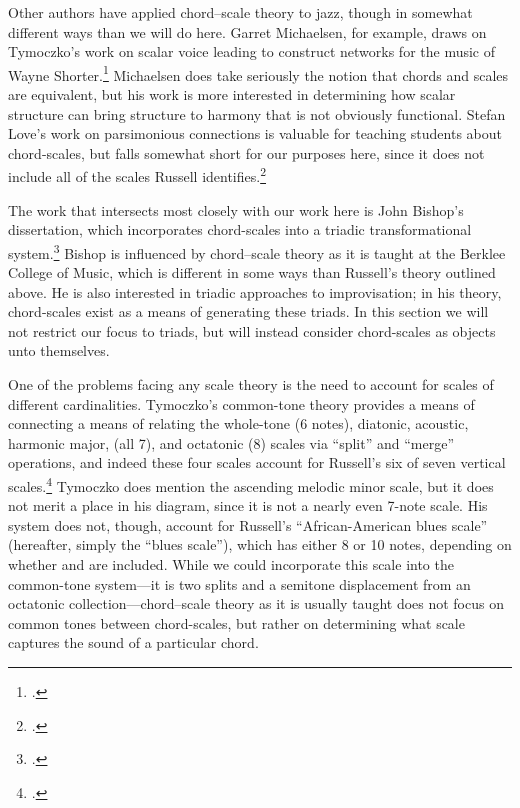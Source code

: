 Other authors have applied chord--scale theory to jazz, though in somewhat
different ways than we will do here. Garret Michaelsen, for example, draws on
Tymoczko's work on scalar voice leading to construct networks for the music of
Wayne Shorter.\footcite{michaelsen:2012} Michaelsen does take seriously the
notion that chords and scales are equivalent, but his work is more interested
in determining how scalar structure can bring structure to harmony that is not
obviously functional. Stefan Love's work on parsimonious connections is
valuable for teaching students about chord-scales, but falls somewhat short
for our purposes here, since it does not include all of the scales Russell
identifies.\footcite{love:2009}

The work that intersects most closely with our work here is John Bishop's
dissertation, which incorporates chord-scales into a triadic transformational
system.\footcite{bishop:2012} Bishop is influenced by chord--scale theory as
it is taught at the Berklee College of Music, which is different in some ways
than Russell's theory outlined above. He is also interested in
triadic approaches to improvisation; in his theory, chord-scales exist as a
means of generating these triads. In this section we will not
restrict our focus to triads, but will instead consider chord-scales as
objects unto themselves.

One of the problems facing any scale theory is the need to account for scales
of different cardinalities. Tymoczko's common-tone theory provides a means of
connecting a means of relating the whole-tone (6 notes), diatonic, acoustic,
harmonic major, (all 7), and octatonic (8) scales via ``split'' and ``merge''
operations, and indeed these four scales account for Russell's six of seven
vertical scales.\footcite[134--35]{tymoczko:2011} Tymoczko does mention the
ascending melodic minor scale, but it does not merit a place in his diagram,
since it is not a nearly even 7-note scale. His system does not, though,
account for Russell's ``African-American blues scale'' (hereafter,
simply the ``blues scale''), which has either 8 or 10 notes, depending on
whether  and \nat{} are included. While we could incorporate this scale into
the common-tone system---it is two splits and a semitone displacement from an
octatonic collection---chord--scale theory as it is usually taught does not
focus on common tones between chord-scales, but rather on determining what
scale captures the sound of a particular chord.

